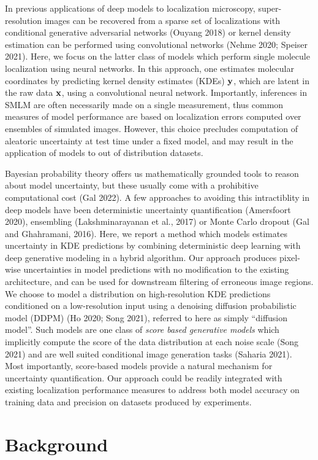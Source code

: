 \documentclass{article}
\begin{document}
In previous applications of deep models to localization microscopy, super-resolution images can be recovered from a sparse set of localizations with conditional generative adversarial networks (Ouyang 2018) or kernel density estimation can be performed using convolutional networks (Nehme 2020; Speiser 2021). Here, we focus on the latter class of models which perform single molecule localization using neural networks. In this approach, one estimates molecular coordinates by predicting kernel density estimates (KDEs) $\bold{y}$, which are latent in the raw data $\bold{x}$, using a convolutional neural network. Importantly, inferences in SMLM are often necessarily made on a single measurement, thus common measures of model performance are based on localization errors computed over ensembles of simulated images. However, this choice precludes computation of aleatoric uncertainty at test time under a fixed model, and may result in the application of models to out of distribution datasets.

Bayesian probability theory offers us mathematically grounded tools to reason about model uncertainty, but these usually come with a prohibitive computational cost (Gal 2022). A few approaches to avoiding this intractiblity in deep models have been deterministic uncertainty quantification (Amersfoort 2020), ensembling (Lakshminarayanan et al., 2017) or Monte Carlo dropout (Gal and Ghahramani, 2016). Here, we report a method which models estimates uncertainty in KDE predictions by combining deterministic deep learning with deep generative modeling in a hybrid algorithm. Our approach produces pixel-wise uncertainties in model predictions with no modification to the existing architecture, and can be used for downstream filtering of erroneous image regions. We choose to model a distribution on high-resolution KDE predictions conditioned on a low-resolution input using a denoising diffusion probabilistic model (DDPM) (Ho 2020; Song 2021), referred to here as simply ``diffusion model''. Such models are one class of \emph{score based generative models} which implicitly compute the score of the data distribution at each noise scale (Song 2021) and are well suited conditional image generation tasks (Saharia 2021). Most importantly, score-based models provide a natural mechanism for uncertainty quantification. Our approach could be readily integrated with existing localization performance measures to address both model accuracy on training data and precision on datasets produced by experiments. 

\section{Background}
\end{document}
